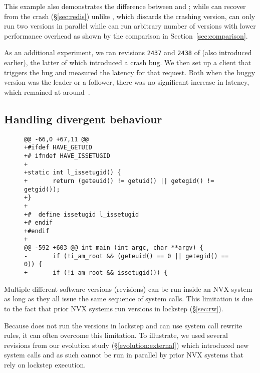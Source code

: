 This example also demonstrates the difference between \mx and \varan; while \mx
can recover from the crash (\S\ref{sec:redis}) unlike \varan, which
discards the crashing version, \mx can only run two versions in parallel
while \varan can run arbitrary number of versions with lower performance
overhead as shown by the comparison in Section~\ref{sec:comparison}.

As an additional experiment, we ran revisions \lstinline`2437` and
\lstinline`2438` of \lighttpd (also introduced earlier), the latter of
which introduced a crash bug.  We then set up a client that triggers the
bug and measured the latency for that request. Both when the buggy
version was the leader or a follower, there was no significant increase
in latency, which remained at around~\lighttpdnormallatency.

\subsection{Handling divergent behaviour}
\label{sec:mv-execution}

\begin{figure}[t]
\begin{center}
\begin{lstlisting}[alsolanguage=diff,numbers=none,label=lst:lighttpd-suid,caption={\lighttpd SUID bit detection patch}]
@@ -66,0 +67,11 @@
+#ifdef HAVE_GETUID
+# ifndef HAVE_ISSETUGID
+
+static int l_issetugid() {
+       return (geteuid() != getuid() || getegid() != getgid());
+}
+
+#  define issetugid l_issetugid
+# endif
+#endif
+
@@ -592 +603 @@ int main (int argc, char **argv) {
-       if (!i_am_root && (geteuid() == 0 || getegid() == 0)) {
+       if (!i_am_root && issetugid()) {
\end{lstlisting}
\end{center}
\end{figure}

Multiple different software versions (revisions) can be run inside an NVX
system as long as they all issue the same sequence of system calls. This
limitation is due to the fact that prior NVX systems run versions in lockstep
(\S\ref{sec:rw}).

Because \varan does not run the versions in lockstep and can use system call
rewrite rules, it can often overcome this limitation. To illustrate, we used
several \lighttpd revisions from our evolution study
(\S\ref{evolution:external}) which introduced new system calls and as such
cannot be run in parallel by prior NVX systems that rely on lockstep execution.

